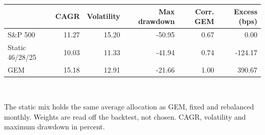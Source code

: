 \small
\begin{tabular}{lrrrrr}
\toprule
  & \textbf{CAGR} & \textbf{Volatility} & \textbf{Max drawdown} & \textbf{Corr. GEM} & \textbf{Excess (bps)} \\
\midrule
S\&P 500 & 11.27 & 15.20 & -50.95 & 0.67 & 0.00 \\
Static 46/28/25 & 10.03 & 11.33 & -41.94 & 0.74 & -124.17 \\
GEM & 15.18 & 12.91 & -21.66 & 1.00 & 390.67 \\
\bottomrule
\end{tabular}
\\[0.4em]
\begin{minipage}{\linewidth}\footnotesize The static mix holds the same average allocation as GEM, fixed and rebalanced monthly. Weights are read off the backtest, not chosen. CAGR, volatility and maximum drawdown in percent.\end{minipage}
